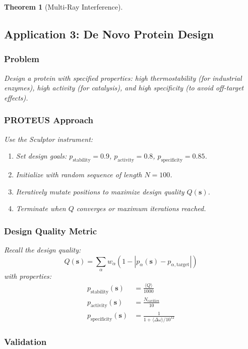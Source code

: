 \documentclass[11pt,a4paper]{article}
\newtheorem{theorem}{Theorem}[section]
\begin{document}
\begin{theorem}[Multi-Ray Interference]
\subsection{Application 3: De Novo Protein Design}

\subsubsection{Problem}

Design a protein with specified properties: high thermostability (for industrial enzymes), high activity (for catalysis), and high specificity (to avoid off-target effects).

\subsubsection{PROTEUS Approach}

Use the Sculptor instrument:
\begin{enumerate}
\item Set design goals: $p_{\text{stability}} = 0.9$, $p_{\text{activity}} = 0.8$, $p_{\text{specificity}} = 0.85$.
\item Initialize with random sequence of length $N = 100$.
\item Iteratively mutate positions to maximize design quality $Q(\mathbf{s})$.
\item Terminate when $Q$ converges or maximum iterations reached.
\end{enumerate}

\subsubsection{Design Quality Metric}

Recall the design quality:
\begin{equation}
Q(\mathbf{s}) = \sum_{\alpha} w_\alpha \left(1 - |p_\alpha(\mathbf{s}) - p_{\alpha,\text{target}}|\right)
\end{equation}
with properties:
\begin{align}
p_{\text{stability}}(\mathbf{s}) &= \frac{\langle Q \rangle}{1000} \\
p_{\text{activity}}(\mathbf{s}) &= \frac{N_{\text{cavities}}}{10} \\
p_{\text{specificity}}(\mathbf{s}) &= \frac{1}{1 + \langle \Delta \omega \rangle / 10^{12}}
\end{align}

\subsubsection{Validation}


\end{theorem}
\end{document}
